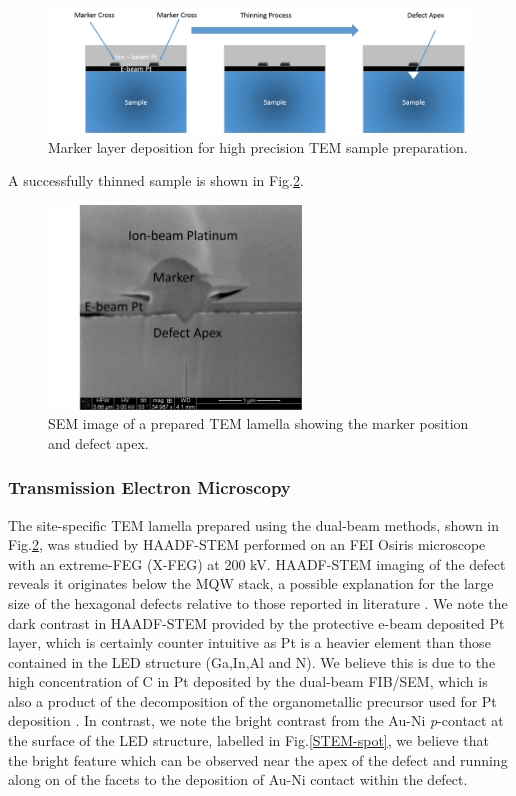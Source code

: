 \begin{figure}[!ht]
	\centering
	\includegraphics[width=1\textwidth]{Figs/Ch3/FIB-loc-diagram}
	\caption[h] {Marker layer deposition for high precision TEM sample preparation.}
	\label{FIBloc}
\end{figure}
\FloatBarrier 

A successfully thinned sample is shown in Fig.\ref{thinned}.

\begin{figure}[h]
	\centering
	\includegraphics[width=0.6\textwidth]{Figs/Ch3/thinned}
	\caption[h] {SEM image of a prepared TEM lamella showing the marker position and defect apex.}
	\label{thinned}
\end{figure}
\FloatBarrier 


\subsubsection{Transmission Electron Microscopy}

The site-specific TEM lamella prepared using the dual-beam methods, shown in Fig.\ref{thinned}, was studied by HAADF-STEM performed on an FEI Osiris microscope with an extreme-FEG (X-FEG)  at 200 kV. HAADF-STEM imaging of the defect reveals it originates below the MQW stack, a possible explanation for the large size of the hexagonal defects relative to those reported in literature \cite{Hangleiter2005,Tsai2007,Oliver2006a}. We note the dark contrast in HAADF-STEM provided by the protective e-beam deposited Pt layer, which is certainly counter intuitive as Pt is a heavier element than those contained in the LED structure (Ga,In,Al and N). We believe this is due to the high concentration of C in Pt deposited by the dual-beam FIB/SEM, which is also a product of the decomposition of the organometallic precursor used for Pt deposition \cite{DaSilva2007}. In contrast, we note the bright contrast from the Au-Ni \textit{p}-contact at the surface of the LED structure, labelled in Fig.\ref{STEM-spot}, we believe that the bright feature which can be observed near the apex of the defect and running along on of the facets to the deposition of Au-Ni contact within the defect.

